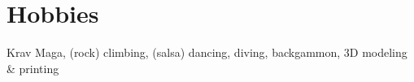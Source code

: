 \section*{Hobbies}
	
	Krav Maga, (rock) climbing, (salsa) dancing, diving, backgammon, 3D modeling \& printing

